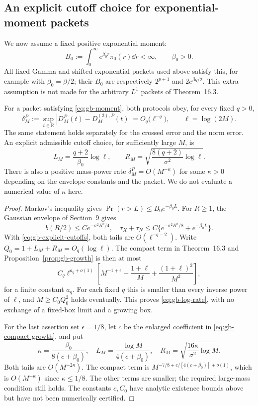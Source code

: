 \subsection{An explicit cutoff choice for exponential-moment packets}
We now assume a fixed positive exponential moment:
\begin{equation}
 B_0:=\int_0^\infty e^{\beta_0r}\pi_0(r)\dd r<\infty,
 \qquad \beta_0>0.
 \label{eq:gb-moment}
\end{equation}
All fixed Gamma and shifted-exponential packets used above satisfy this,
for example with $\beta_0=\beta/2$; their $B_0$ are respectively
$2^{p+1}$ and $2e^{\beta g/2}$. This extra assumption is not made for
the arbitrary $L^1$ packets of Theorem~16.3.

\begin{theorem}
For a packet satisfying \eqref{eq:gb-moment}, both protocols obey,
for every fixed $q>0$,
\begin{equation}
 \delta_M^P:=\sup_{t\in\mathbb R}|D_M^P(t)-D_M^{(2),P}(t)|
 =O_q\bigl(\ell^{-q}\bigr),\qquad \ell=\log(2M).
 \label{eq:gb-log-rate}
\end{equation}
The same statement holds separately for the crossed error and the norm
error. An explicit admissible cutoff choice, for sufficiently large $M$, is
\begin{equation}
 L_M=\frac{q+2}{\beta_0}\log\ell,
 \qquad R_M=\sqrt{\frac{8(q+2)}{\sigma^2}\log\ell}.
 \label{eq:gb-explicit-cutoffs}
\end{equation}
There is also a positive mass-power rate $\delta_M^P=O(M^{-\kappa})$
for some $\kappa>0$ depending on the envelope constants and the packet.
We do not evaluate a numerical value of $\kappa$ here.
\label{thm:gb-rate}
\end{theorem}
\begin{proof}
Markov's inequality gives $\Pr(r>L)\le B_0e^{-\beta_0L}$.
For $R\ge1$, the Gaussian envelope of Section~9 gives
\[
 b(R/2)\le C e^{-\sigma^2R^2/4},\quad
 \tau_X+\tau_N\le C\{e^{-\sigma^2R^2/8}+e^{-\beta_0L}\}.
\]
With \eqref{eq:gb-explicit-cutoffs}, both tails are
$O(\ell^{-q-2})$. Write $Q_0=1+L_M+R_M=O_q(\log\ell)$.
The compact term in Theorem~16.3 and
Proposition~\ref{prop:gb-growth} is then at most
\[
 C_q\ell^{a_q+o(1)}
 \left[M^{-1+\epsilon}+\frac{1+\ell}{M}
                        +\frac{(1+\ell)^2}{M^2}\right],
\]
for a finite constant $a_q$. For each fixed $q$ this is smaller than
every inverse power of $\ell$, and $M\ge C_0Q_0^2$ holds eventually.
This proves \eqref{eq:gb-log-rate}, with no exchange of a fixed-box
limit and a growing box.

For the last assertion set $\epsilon=1/8$, let $c$ be the enlarged
coefficient in \eqref{eq:gb-compact-growth}, and put
\[
 \kappa=\frac{\beta_0}{8(c+\beta_0)},\quad
 L_M=\frac{\log M}{4(c+\beta_0)},\quad
 R_M=\sqrt{\frac{16\kappa}{\sigma^2}\log M}.
\]
Both tails are $O(M^{-2\kappa})$. The compact term is
$M^{-7/8+c/[4(c+\beta_0)]+o(1)}$, which is $O(M^{-\kappa})$
since $\kappa\le1/8$. The other terms are smaller; the required
large-mass condition still holds. The constants $c,C_0$ have analytic
existence bounds above but have not been numerically certified.
\end{proof}

